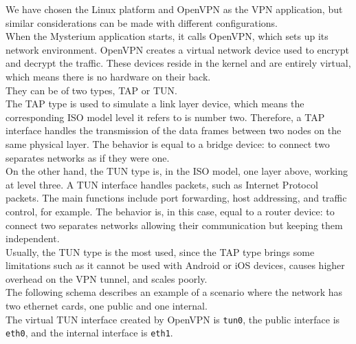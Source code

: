 \documentclass[12pt]{article}
\begin{document}
	We have chosen the Linux platform and OpenVPN as the VPN application, but similar considerations can be made with different configurations.\\
	When the Mysterium application starts, it calls OpenVPN, which sets up its network environment. OpenVPN creates a virtual network device used to encrypt and decrypt the traffic. These devices reside in the kernel and are entirely virtual, which means there is no hardware on their back.\\
	They can be of two types, TAP or TUN.\\
	The TAP type is used to simulate a link layer device, which means the corresponding ISO model level it refers to is number two. Therefore, a TAP interface handles the transmission of the data frames between two nodes on the same physical layer. The behavior is equal to a bridge device: to connect two separates networks as if they were one.\\
	On the other hand, the TUN type is, in the ISO model, one layer above, working at level three. A TUN interface handles packets, such as Internet Protocol packets. The main functions include port forwarding, host addressing, and traffic control, for example. The behavior is, in this case, equal to a router device: to connect two separates networks allowing their communication but keeping them independent.\\
	Usually, the TUN type is the most used, since the TAP type brings some limitations such as it cannot be used with Android or iOS devices, causes higher overhead on the VPN tunnel, and scales poorly.\\
	The following schema describes an example of a scenario where the network has two ethernet cards, one public and one internal.\\
	The virtual TUN interface created by OpenVPN is \lstinline{tun0}, the public interface is \lstinline{eth0}, and the internal interface is \lstinline{eth1}.\\
\end{document}
